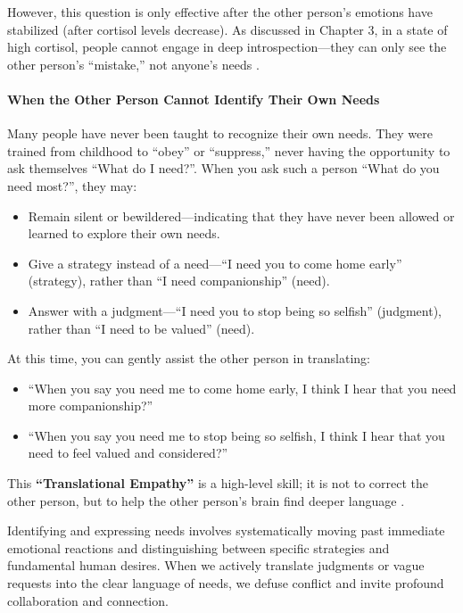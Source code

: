 However, this question is only effective after the other person's emotions
have stabilized (after cortisol levels decrease).
As discussed in Chapter 3, in a state of high cortisol, people cannot
engage in deep introspection---they can only see the other person's
``mistake,'' not anyone's needs \citep{aghaziarati2023}.

\paragraph{When the Other Person Cannot Identify Their Own Needs}
Many people have never been taught to recognize their own needs.
They were trained from childhood to ``obey'' or ``suppress,'' never having
the opportunity to ask themselves ``What do I need?''.
When you ask such a person ``What do you need most?'', they may:
\begin{itemize}
    \item Remain silent or bewildered---indicating that they have never
    been allowed or learned to explore their own needs.
    \item Give a strategy instead of a need---``I need you to come home
    early'' (strategy), rather than ``I need companionship'' (need).
    \item Answer with a judgment---``I need you to stop being so selfish''
    (judgment), rather than ``I need to be valued'' (need).
\end{itemize}

At this time, you can gently assist the other person in translating:
\begin{itemize}
    \item ``When you say you need me to come home early, I think I hear
    that you need more companionship?''
    \item ``When you say you need me to stop being so selfish, I think I
    hear that you need to feel valued and considered?''
\end{itemize}

This \textbf{``Translational Empathy''} is a high-level skill; it is not
to correct the other person, but to help the other person's brain find
deeper language \citep{dunn2000}.

\begin{keyinsight}
Identifying and expressing needs involves systematically moving past
immediate emotional reactions and distinguishing between specific strategies
and fundamental human desires.
When we actively translate judgments or vague requests into the clear language
of needs, we defuse conflict and invite profound collaboration and connection.
\end{keyinsight}
